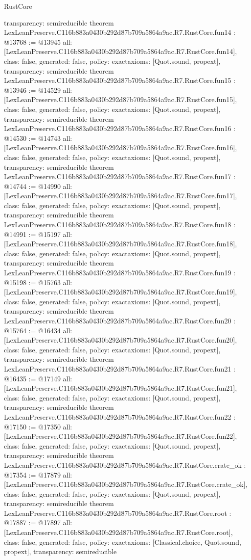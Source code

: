 \begin{lexlean}{RustCore}
\begin{coremodule}
{  transparency: semireducible
}
theorem LexLeanPreserve.C116b883a0430b292d87b709a5864a9ac.R7.RustCore.fun14 : @13768 := @13945 {
  all: [LexLeanPreserve.C116b883a0430b292d87b709a5864a9ac.R7.RustCore.fun14],
  class: false,
  generated: false,
  policy: exact{axioms: [Quot.sound, propext]},
  transparency: semireducible
}
theorem LexLeanPreserve.C116b883a0430b292d87b709a5864a9ac.R7.RustCore.fun15 : @13946 := @14529 {
  all: [LexLeanPreserve.C116b883a0430b292d87b709a5864a9ac.R7.RustCore.fun15],
  class: false,
  generated: false,
  policy: exact{axioms: [Quot.sound, propext]},
  transparency: semireducible
}
theorem LexLeanPreserve.C116b883a0430b292d87b709a5864a9ac.R7.RustCore.fun16 : @14530 := @14743 {
  all: [LexLeanPreserve.C116b883a0430b292d87b709a5864a9ac.R7.RustCore.fun16],
  class: false,
  generated: false,
  policy: exact{axioms: [Quot.sound, propext]},
  transparency: semireducible
}
theorem LexLeanPreserve.C116b883a0430b292d87b709a5864a9ac.R7.RustCore.fun17 : @14744 := @14990 {
  all: [LexLeanPreserve.C116b883a0430b292d87b709a5864a9ac.R7.RustCore.fun17],
  class: false,
  generated: false,
  policy: exact{axioms: [Quot.sound, propext]},
  transparency: semireducible
}
theorem LexLeanPreserve.C116b883a0430b292d87b709a5864a9ac.R7.RustCore.fun18 : @14991 := @15197 {
  all: [LexLeanPreserve.C116b883a0430b292d87b709a5864a9ac.R7.RustCore.fun18],
  class: false,
  generated: false,
  policy: exact{axioms: [Quot.sound, propext]},
  transparency: semireducible
}
theorem LexLeanPreserve.C116b883a0430b292d87b709a5864a9ac.R7.RustCore.fun19 : @15198 := @15763 {
  all: [LexLeanPreserve.C116b883a0430b292d87b709a5864a9ac.R7.RustCore.fun19],
  class: false,
  generated: false,
  policy: exact{axioms: [Quot.sound, propext]},
  transparency: semireducible
}
theorem LexLeanPreserve.C116b883a0430b292d87b709a5864a9ac.R7.RustCore.fun20 : @15764 := @16434 {
  all: [LexLeanPreserve.C116b883a0430b292d87b709a5864a9ac.R7.RustCore.fun20],
  class: false,
  generated: false,
  policy: exact{axioms: [Quot.sound, propext]},
  transparency: semireducible
}
theorem LexLeanPreserve.C116b883a0430b292d87b709a5864a9ac.R7.RustCore.fun21 : @16435 := @17149 {
  all: [LexLeanPreserve.C116b883a0430b292d87b709a5864a9ac.R7.RustCore.fun21],
  class: false,
  generated: false,
  policy: exact{axioms: [Quot.sound, propext]},
  transparency: semireducible
}
theorem LexLeanPreserve.C116b883a0430b292d87b709a5864a9ac.R7.RustCore.fun22 : @17150 := @17350 {
  all: [LexLeanPreserve.C116b883a0430b292d87b709a5864a9ac.R7.RustCore.fun22],
  class: false,
  generated: false,
  policy: exact{axioms: [Quot.sound, propext]},
  transparency: semireducible
}
theorem LexLeanPreserve.C116b883a0430b292d87b709a5864a9ac.R7.RustCore.crate_ok : @17354 := @17879 {
  all: [LexLeanPreserve.C116b883a0430b292d87b709a5864a9ac.R7.RustCore.crate_ok],
  class: false,
  generated: false,
  policy: exact{axioms: [Quot.sound, propext]},
  transparency: semireducible
}
theorem LexLeanPreserve.C116b883a0430b292d87b709a5864a9ac.R7.RustCore.root : @17887 := @17897 {
  all: [LexLeanPreserve.C116b883a0430b292d87b709a5864a9ac.R7.RustCore.root],
  class: false,
  generated: false,
  policy: exact{axioms: [Classical.choice, Quot.sound, propext]},
  transparency: semireducible
}


\end{coremodule}
\end{lexlean}
